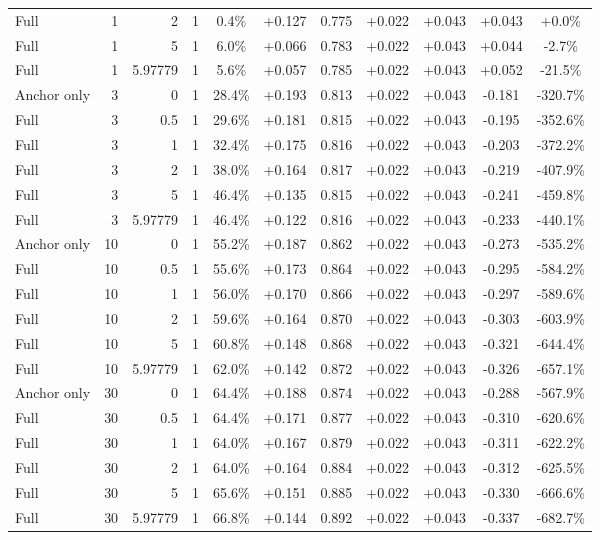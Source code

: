 \begin{table}[htbp]
\begin{tabular}{lrrrccccccc}
Full & 1 & 2 & 1 & 0.4\% & +0.127 & 0.775 & +0.022 & +0.043 & +0.043 & +0.0\% \\
Full & 1 & 5 & 1 & 6.0\% & +0.066 & 0.783 & +0.022 & +0.043 & +0.044 & -2.7\% \\
Full & 1 & 5.97779 & 1 & 5.6\% & +0.057 & 0.785 & +0.022 & +0.043 & +0.052 & -21.5\% \\
Anchor only & 3 & 0 & 1 & 28.4\% & +0.193 & 0.813 & +0.022 & +0.043 & -0.181 & -320.7\% \\
Full & 3 & 0.5 & 1 & 29.6\% & +0.181 & 0.815 & +0.022 & +0.043 & -0.195 & -352.6\% \\
Full & 3 & 1 & 1 & 32.4\% & +0.175 & 0.816 & +0.022 & +0.043 & -0.203 & -372.2\% \\
Full & 3 & 2 & 1 & 38.0\% & +0.164 & 0.817 & +0.022 & +0.043 & -0.219 & -407.9\% \\
Full & 3 & 5 & 1 & 46.4\% & +0.135 & 0.815 & +0.022 & +0.043 & -0.241 & -459.8\% \\
Full & 3 & 5.97779 & 1 & 46.4\% & +0.122 & 0.816 & +0.022 & +0.043 & -0.233 & -440.1\% \\
Anchor only & 10 & 0 & 1 & 55.2\% & +0.187 & 0.862 & +0.022 & +0.043 & -0.273 & -535.2\% \\
Full & 10 & 0.5 & 1 & 55.6\% & +0.173 & 0.864 & +0.022 & +0.043 & -0.295 & -584.2\% \\
Full & 10 & 1 & 1 & 56.0\% & +0.170 & 0.866 & +0.022 & +0.043 & -0.297 & -589.6\% \\
Full & 10 & 2 & 1 & 59.6\% & +0.164 & 0.870 & +0.022 & +0.043 & -0.303 & -603.9\% \\
Full & 10 & 5 & 1 & 60.8\% & +0.148 & 0.868 & +0.022 & +0.043 & -0.321 & -644.4\% \\
Full & 10 & 5.97779 & 1 & 62.0\% & +0.142 & 0.872 & +0.022 & +0.043 & -0.326 & -657.1\% \\
Anchor only & 30 & 0 & 1 & 64.4\% & +0.188 & 0.874 & +0.022 & +0.043 & -0.288 & -567.9\% \\
Full & 30 & 0.5 & 1 & 64.4\% & +0.171 & 0.877 & +0.022 & +0.043 & -0.310 & -620.6\% \\
Full & 30 & 1 & 1 & 64.0\% & +0.167 & 0.879 & +0.022 & +0.043 & -0.311 & -622.2\% \\
Full & 30 & 2 & 1 & 64.0\% & +0.164 & 0.884 & +0.022 & +0.043 & -0.312 & -625.5\% \\
Full & 30 & 5 & 1 & 65.6\% & +0.151 & 0.885 & +0.022 & +0.043 & -0.330 & -666.6\% \\
Full & 30 & 5.97779 & 1 & 66.8\% & +0.144 & 0.892 & +0.022 & +0.043 & -0.337 & -682.7\% \\

\end{tabular}
\end{table}
